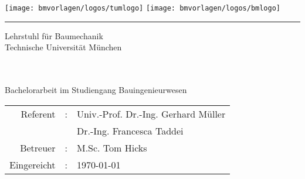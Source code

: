 {
\begin{titlepage}

\begin{center}
{
\fontsize{18}{18}\selectfont 

\texttt{[image: bmvorlagen/logos/tumlogo]} \hfill \texttt{[image: bmvorlagen/logos/bmlogo]}
\vspace{0.5cm}
\hrule

\vspace{1cm}
Lehrstuhl für Baumechanik\\
Technische Universität München\\

\vspace{1.4cm}

\vspace{2cm}


\vspace{3mm}



\bmtitle \\[5ex]


\bmauthor \\[7ex]


Bachelorarbeit im Studiengang Bauingenieurwesen\\


\vspace{1.8cm}

{\fontsize{12pt}{12} \selectfont%
\begin{tabular}{rll}
Referent&:& Univ.-Prof. Dr.-Ing. Gerhard Müller\\
& & Dr.-Ing. Francesca Taddei\\[0.5ex]
Betreuer&:& M.Sc. Tom Hicks\\[0.5ex]
Eingereicht&:& \today
\end{tabular}
}
                  

}
\end{center}

\end{titlepage}
}
